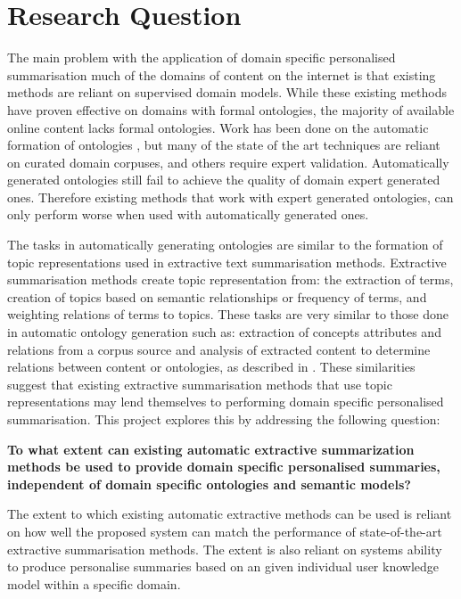 \section{Research Question}

The main problem with the application of domain specific personalised summarisation much of the domains of content on the internet is that existing methods are reliant on supervised domain models. While these existing methods have proven effective on domains with formal ontologies, the majority of available online content lacks formal ontologies. Work has been done on the automatic formation of ontologies \citep{bedini2007automatic}, but many of the state of the art techniques are reliant on curated domain corpuses, and others require expert validation. Automatically generated ontologies still fail to achieve the quality of domain expert generated ones. Therefore existing methods that work with expert generated ontologies, can only perform worse when used with automatically generated ones.

The tasks in automatically generating ontologies are similar to the formation of topic representations used in extractive text summarisation methods. Extractive summarisation methods create topic representation from: the extraction of terms, creation of topics based on semantic relationships or frequency of terms, and weighting relations of terms to topics. These tasks are very similar to those done in automatic ontology generation such as: extraction of concepts attributes and relations from a corpus source and analysis of extracted content to determine relations between content or ontologies, as described in \citep{bedini2007automatic}. These similarities suggest that existing extractive summarisation methods that use topic representations may lend themselves to performing domain specific personalised summarisation. This project explores this by addressing the following question:

\textbf{To what extent can existing automatic extractive summarization methods be used to provide domain specific personalised summaries, independent of domain specific ontologies and semantic models?}

The extent to which existing automatic extractive methods can be used is reliant on how well the proposed system can match the performance of state-of-the-art extractive summarisation methods. The extent is also reliant on systems ability to produce personalise summaries based on an given individual user knowledge model within a specific domain. 

